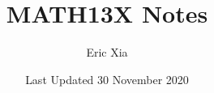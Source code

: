 \documentclass{article}
\title{MATH13X Notes}
\author{Eric Xia}
\date{Last Updated 30 November 2020}
\begin{document}
    \maketitle
    \tableofcontents
    \pagebreak



    
    
    
    
    
    
    


    
\end{document}
